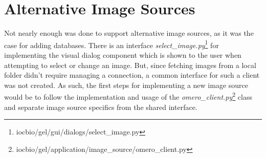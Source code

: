 \section{Alternative Image Sources}
Not nearly enough was done to support alternative image sources, as it was the case for adding databases. There is an interface \emph{select\_image.py}\footnote{iocbio/gel/gui/dialogs/select\_image.py} for implementing the visual dialog component which is shown to the user when attempting to select or change an image. But, since fetching images from a local folder didn't require managing a connection, a common interface for such a client was not created. As such, the first steps for implementing a new image source would be to follow the implementation and usage of the \emph{omero\_client.py}\footnote{iocbio/gel/application/image\_source/omero\_client.py} class and separate image source specifics from the shared interface.
